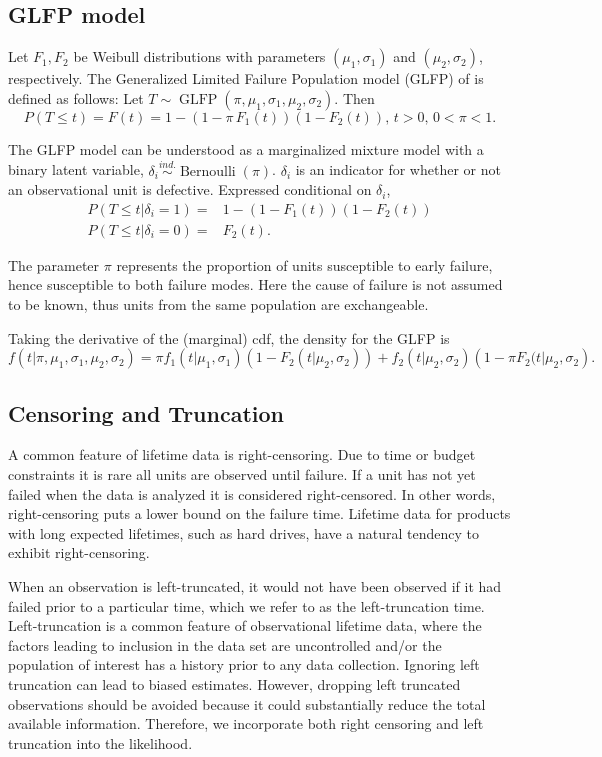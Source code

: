 \documentclass[12pt]{article}
\newcommand{\ind}{\stackrel{ind.}{\sim}}
\newcommand{\op}{\operatorname}
\begin{document}
\subsection{GLFP model}
\label{subsec:GLFP model}
Let $F_1,F_2$ be Weibull distributions with parameters $(\mu_1,\sigma_1)$ and $(\mu_2, \sigma_2)$, respectively.
The Generalized Limited Failure Population model (GLFP) of \citet{chan} is defined as follows: Let $T \sim \op{GLFP}(\pi, \mu_1,\sigma_1,\mu_2,\sigma_2)$. Then
$$P(T \le t) = F(t) = 1 - (1-\pi\, F_{1}(t))(1 - F_{2}(t)),\, t>0,\, 0 < \pi < 1.$$

The GLFP model can be understood as a marginalized mixture model with a binary latent variable, $\delta_i\ind \op{Bernoulli}(\pi)$. $\delta_i$ is an indicator for whether or not an observational unit is defective. Expressed conditional on $\delta_i$,
\begin{align*}
P(T\le t | \delta_i=1) =& 1 -(1-F_1(t))(1-F_2(t))\\
P(T\le t | \delta_i=0) =& F_2(t).
\end{align*}

 
The parameter $\pi$ represents the proportion of units susceptible to early failure, hence susceptible to both failure modes. Here the cause of failure is not assumed to be known, thus units from the same population are exchangeable.

Taking the derivative of the (marginal) cdf, the density for the GLFP is
\begin{equation}
f(t|\pi, \mu_1,\sigma_1, \mu_2, \sigma_2) = \pi f_1(t|\mu_1,\sigma_1)\left(1-F_2(t|\mu_2,\sigma_2)\right) + f_2(t|\mu_2,\sigma_2)\left(1-\pi F_2(t|\mu_2,\sigma_2\right).
\end{equation}

\subsection{Censoring and Truncation}
A common feature of lifetime data is right-censoring. Due to time or budget constraints it is rare all units are observed until failure. If a unit has not yet failed when the data is analyzed it is considered right-censored.  In other words, right-censoring puts a lower bound on the failure time.  Lifetime data for products with long expected lifetimes, such as hard drives, have a natural tendency to exhibit right-censoring.


When an observation is left-truncated, it would not have been observed if it had failed prior to a particular time, which we refer to as the left-truncation time.  Left-truncation is a common feature of observational lifetime data, where the factors leading to inclusion in the data set are uncontrolled and/or the population of interest has a history prior to any data collection. Ignoring left truncation can lead to biased estimates. However, dropping left truncated observations should be avoided because it could substantially reduce the total available information.  Therefore, we incorporate both right censoring and left truncation into the likelihood. 
\end{document}
